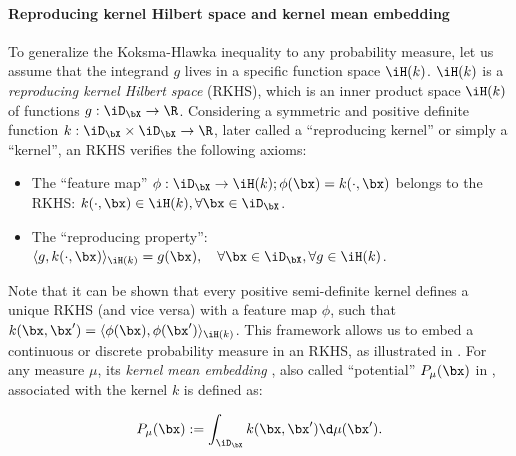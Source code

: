 \paragraph{Reproducing kernel Hilbert space and kernel mean embedding}
To generalize the Koksma-Hlawka inequality to any probability measure, let us assume that the integrand $g$ lives in a specific function space $\iH(k)$. $\iH(k)$ is a \emph{reproducing kernel Hilbert space} (RKHS), which is an inner product space $\iH(k)$ of functions $g:\iD_{\bX} \rightarrow \R$. 
Considering a symmetric and positive definite function $k: \iD_{\bX} \times \iD_{\bX} \rightarrow \R$, later called a ``reproducing kernel'' or simply a ``kernel'', an RKHS verifies the following axioms: 
\begin{itemize}
    \item The ``feature map'' $\phi : \iD_{\bX} \to \iH(k); \phi(\bx) = k(\cdot, \bx)$ belongs to the RKHS: $k(\cdot, \bx) \in \iH(k), \forall \bx \in \iD_{\bX}$.
    \item The ``reproducing property'': $\langle g, k(\cdot, \bx) \rangle_{\iH(k)} = g(\bx), \quad \forall \bx \in \iD_{\bX}, \forall g \in \iH(k)$.
\end{itemize}
Note that it can be shown that every positive semi-definite kernel defines a unique RKHS (and vice versa) with a feature map $\phi$, such that $k(\bx, \bx') = \langle \phi(\bx), \phi(\bx') \rangle_{\iH(k)}$.
This framework allows us to embed a continuous or discrete probability measure in an RKHS, as illustrated in . 
For any measure $\mu$, its \emph{kernel mean embedding} \citep{sejdinovic_2013}, also called ``potential'' $P_{\mu}(\bx)$ in \cite{pronzato_zhigljavsky_2020}, associated with the kernel $k$ is defined as:

\begin{equation}
   P_{\mu}(\bx) := \int_{\iD_{\bX}} k(\bx, \bx') \d \mu(\bx').
\end{equation}

